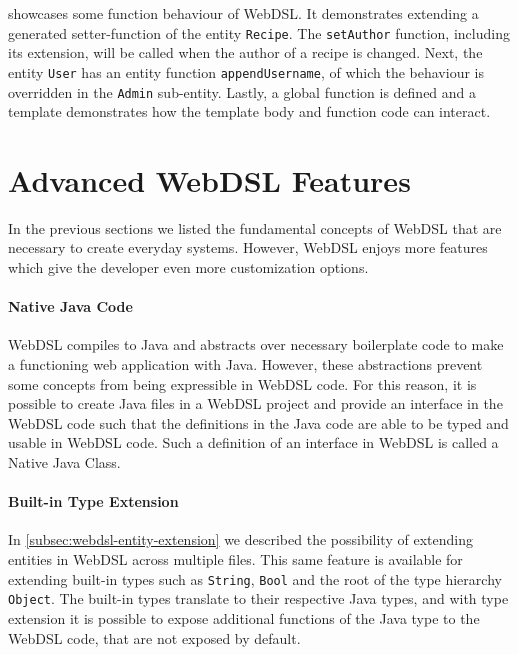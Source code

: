     showcases some function behaviour of WebDSL. It demonstrates extending a generated setter-function of the entity \texttt{Recipe}. The \texttt{setAuthor} function, including its extension, will be called when the author of a recipe is changed. Next, the entity \texttt{User} has an entity function \texttt{appendUsername}, of which the behaviour is overridden in the \texttt{Admin} sub-entity. Lastly, a global function is defined and a template demonstrates how the template body and function code can interact.
  
  \section{\label{sec:advanced-webdsl-features}Advanced WebDSL Features}

    In the previous sections we listed the fundamental concepts of WebDSL that are necessary to create everyday systems. However, WebDSL enjoys more features which give the developer even more customization options.

    \paragraph{Native Java Code} WebDSL compiles to Java and abstracts over necessary boilerplate code to make a functioning web application with Java. However, these abstractions prevent some concepts from being expressible in WebDSL code. For this reason, it is possible to create Java files in a WebDSL project and provide an interface in the WebDSL code such that the definitions in the Java code are able to be typed and usable in WebDSL code. Such a definition of an interface in WebDSL is called a Native Java Class.

    \paragraph{Built-in Type Extension} In \cref{subsec:webdsl-entity-extension} we described the possibility of extending entities in WebDSL across multiple files. This same feature is available for extending built-in types such as \texttt{String}, \texttt{Bool} and the root of the type hierarchy \texttt{Object}. The built-in types translate to their respective Java types, and with type extension it is possible to expose additional functions of the Java type to the WebDSL code, that are not exposed by default.

